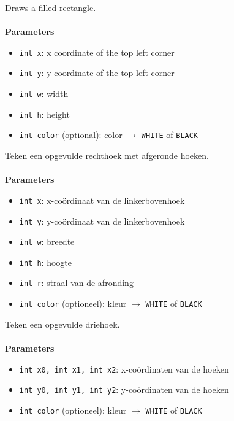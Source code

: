 \documentclass[11pt,fleqn]{book} %
\begin{document}
\begin{libf}[fillRect(x, y, w, h, \emph{color=WHITE})]
	Draws a filled rectangle.\\ \\
	\textbf{Parameters}
	\begin{itemize}
		\item \texttt{int x}: x coordinate of the top left corner
		\item \texttt{int y}: y coordinate of the top left corner
		\item \texttt{int w}: width
		\item \texttt{int h}: height
		\item \texttt{int color} (optional): color $\rightarrow$ \texttt{WHITE} of \texttt{BLACK}
	\end{itemize}
\end{libf}

\pagebreak

\begin{libf}[fillRoundRect(x, y, w, h, r, \emph{color=WHITE})]
	Teken een opgevulde rechthoek met afgeronde hoeken.\\ \\
	\textbf{Parameters}
	\begin{itemize}
		\item \texttt{int x}: x-coördinaat van de linkerbovenhoek
		\item \texttt{int y}: y-coördinaat van de linkerbovenhoek
		\item \texttt{int w}: breedte
		\item \texttt{int h}: hoogte
		\item \texttt{int r}: straal van de afronding
		\item \texttt{int color} (optioneel): kleur $\rightarrow$ \texttt{WHITE} of \texttt{BLACK}
	\end{itemize}
\end{libf}

\begin{libf}[fillTriangle(x0, y0, x1, y1, x2, y2, \emph{color=WHITE})]
	Teken een opgevulde driehoek.\\ \\
	\textbf{Parameters}
	\begin{itemize}
		\item \texttt{int x0, int x1, int x2}: x-coördinaten van de hoeken
		\item \texttt{int y0, int y1, int y2}: y-coördinaten van de hoeken
		\item \texttt{int color} (optioneel): kleur $\rightarrow$ \texttt{WHITE} of \texttt{BLACK}
	\end{itemize}
\end{libf}
\end{document}

